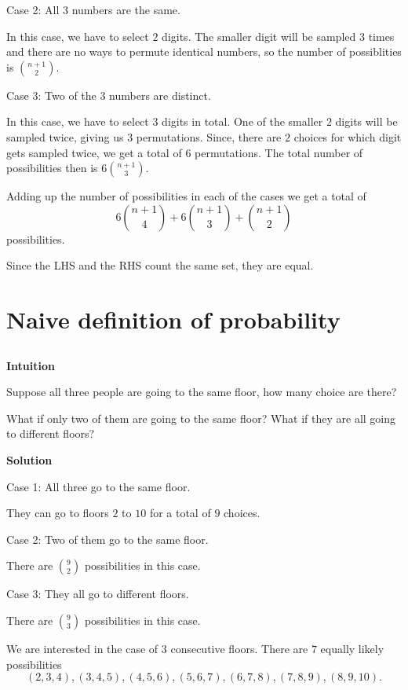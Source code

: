 \documentclass[]{book}
\begin{document}
Case 2: All \(3\) numbers are the same.

In this case, we have to select \(2\) digits. The smaller digit will be
sampled \(3\) times and there are no ways to permute identical numbers,
so the number of possiblities is \({n+1 \choose 2}\).

Case 3: Two of the \(3\) numbers are distinct.

In this case, we have to select \(3\) digits in total. One of the
smaller \(2\) digits will be sampled twice, giving us \(3\)
permutations. Since, there are \(2\) choices for which digit gets
sampled twice, we get a total of \(6\) permutations. The total number of
possibilities then is \(6{n+1 \choose 3}\).

Adding up the number of possibilities in each of the cases we get a
total of \[6{n+1 \choose 4} + 6{n+1 \choose 3} + {n+1 \choose 2}\]
possibilities.

Since the LHS and the RHS count the same set, they are equal.

\section{Naive definition of
probability}\label{naive-definition-of-probability}

\subsection{}\label{section-22}

\textbf{Intuition}

Suppose all three people are going to the same floor, how many choice
are there?

What if only two of them are going to the same floor? What if they are
all going to different floors?

 \textbf{Solution}

Case 1: All three go to the same floor.

They can go to floors \(2\) to \(10\) for a total of \(9\) choices.

Case 2: Two of them go to the same floor.

There are \(9 \choose 2\) possibilities in this case.

Case 3: They all go to different floors.

There are \(9 \choose 3\) possibilities in this case.

We are interested in the case of \(3\) consecutive floors. There are
\(7\) equally likely possibilities
\[(2, 3, 4), (3, 4, 5), (4, 5, 6), (5, 6, 7), (6, 7, 8), (7, 8, 9), (8, 9, 10).\]
\end{document}
